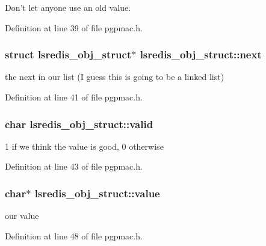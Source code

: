 Don't let anyone use an old value. 



Definition at line 39 of file pgpmac.\-h.

\hypertarget{structlsredis__obj__struct_afb7259e8c3c1c83ccc234b2b2894f2b0}{
\subsubsection[{next}]{\setlength{\rightskip}{0pt plus 5cm}struct {\bf lsredis\-\_\-obj\-\_\-struct}$\ast$ lsredis\-\_\-obj\-\_\-struct\-::next}}\label{structlsredis__obj__struct_afb7259e8c3c1c83ccc234b2b2894f2b0}


the next in our list (I guess this is going to be a linked list) 



Definition at line 41 of file pgpmac.\-h.

\hypertarget{structlsredis__obj__struct_a338ffa4123bd06b39c8b58f5e695575e}{
\subsubsection[{valid}]{\setlength{\rightskip}{0pt plus 5cm}char lsredis\-\_\-obj\-\_\-struct\-::valid}}\label{structlsredis__obj__struct_a338ffa4123bd06b39c8b58f5e695575e}


1 if we think the value is good, 0 otherwise 



Definition at line 43 of file pgpmac.\-h.

\hypertarget{structlsredis__obj__struct_a0465c65288e8101805a6f91049164517}{
\subsubsection[{value}]{\setlength{\rightskip}{0pt plus 5cm}char$\ast$ lsredis\-\_\-obj\-\_\-struct\-::value}}\label{structlsredis__obj__struct_a0465c65288e8101805a6f91049164517}


our value 



Definition at line 48 of file pgpmac.\-h.

